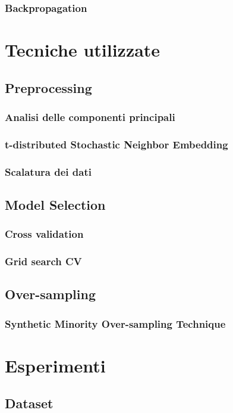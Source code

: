 \documentclass[12pt, twoside, letterpaper]{report}
\begin{document}
			\subsection{Backpropagation}
				
				
	\chapter{Tecniche utilizzate}
		\section{Preprocessing}
			\subsection{Analisi delle componenti principali}
			\subsection{t-distributed Stochastic Neighbor Embedding}
			\subsection{Scalatura dei dati}
			
		\section{Model Selection}
			\subsection{Cross validation}
			\subsection{Grid search CV}
	
		\section{Over-sampling}
			\subsection{Synthetic Minority Over-sampling Technique}
		
	\chapter{Esperimenti}
		\section{Dataset}
\end{document}
